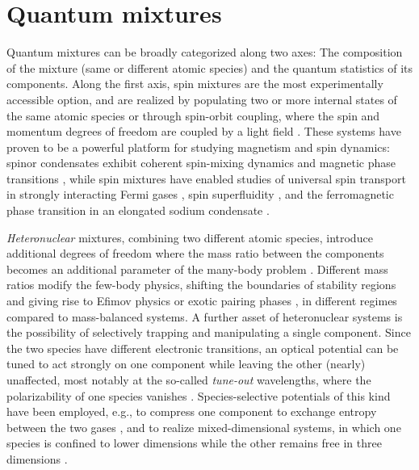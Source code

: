 



\section{Quantum mixtures}%



Quantum mixtures can be broadly categorized along two axes: The composition of the mixture (same or different atomic species) and the quantum statistics of its components. Along the first axis, spin mixtures are the most experimentally accessible option, and are realized by populating two or more internal states of the same atomic species \cite{Matthews1999via}  or through spin-orbit coupling, where the spin and momentum degrees of freedom are coupled by a light field \cite{Lin2011soc}. These systems have proven to be a powerful platform for studying magnetism and spin dynamics: spinor condensates exhibit coherent spin-mixing dynamics and magnetic phase transitions \cite{Stamper-Kurn2013sbg}, while spin mixtures have enabled studies of universal spin transport in strongly interacting Fermi gases \cite{Sommer2011ust}, spin superfluidity \cite{Fava2018oos}, and the ferromagnetic phase transition in an elongated sodium condensate \cite{Cominotti2023fia}. 

\textit{Heteronuclear} 
 mixtures, combining two different atomic species, introduce additional degrees of freedom where the mass ratio between the components becomes an additional parameter of the many-body problem \cite{Petrov2005dmi}. Different mass ratios modify the few-body physics, shifting the boundaries of stability regions and giving rise to Efimov physics \cite{Naidon2017epa} or exotic pairing phases \cite{Pini2021bmf}, in different regimes compared to  mass-balanced systems.  A further asset of heteronuclear systems is the possibility of selectively trapping and manipulating a single component. Since the two species have different electronic transitions, an optical potential can be tuned to act strongly on one component while leaving the other (nearly) unaffected, most notably at the so-called \textit{tune-out} wavelengths, where the polarizability of one species vanishes \cite{LeBlanc2007sso}. Species-selective potentials of this kind have been employed, e.g., to compress one component to exchange entropy between the two gases \cite{Catani2009eei}, and to realize mixed-dimensional systems, in which one species is confined to lower dimensions while the other remains free in three dimensions \cite{Lamporesi2010sim}. 

